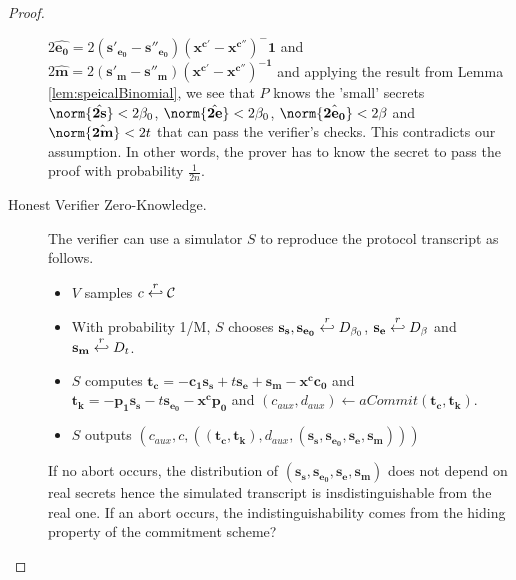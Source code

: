 \begin{proof}
\begin{description}
    $2\hat{\mathbf{e_0}} = 2\mathbf{(s'_{e_0}-s''_{e_0})(x^{c'} -
      x^{c''})^-1}$ and $2\hat{\mathbf{m}}=2\mathbf{(s'_m -
      s''_m)(x^{c'} - x^{c''})^{-1}}$ and applying the result from Lemma
    \ref{lem:speicalBinomial}, we see that $P$ knows the 'small' secrets
    $\norm{\hat{\mathbf{2s}}} < 2\beta_0$, $\norm{\hat{\mathbf{2e}}} <
    2\beta_0$, $\norm{\hat{\mathbf{2e_0}}} < 2\beta$ and
    $\norm{\hat{\mathbf{2m}}} < 2t$ that can pass the verifier's checks.
    This contradicts our assumption. In other words, the prover has to
    know the secret to pass the proof with probability
    $\frac{1}{2n}$.
  \item [Honest Verifier Zero-Knowledge.] The verifier can use a
    simulator $S$ to reproduce the
    protocol transcript as follows.
    \begin{itemize}
    \item $V$ samples $c \stackrel{r}{\hookleftarrow} \mathcal{C}$
    \item With probability 1/M, $S$ chooses $\mathbf{s_s, s_{e_0}}
      \stackrel{r}{\hookleftarrow} D_{\beta_0}$, $\mathbf{s_e} \stackrel{r}{\hookleftarrow}
      D_{\beta}$ and $\mathbf{s_m} \stackrel{r}{\hookleftarrow} D_t$.
    \item $S$
      computes $\mathbf{t_c} = \mathbf{-c_1s_s} + t\mathbf{s_e} +
      \mathbf{s_m} - \mathbf{x^cc_0}$ and $\mathbf{t_k} =
      -\mathbf{p_1s_s} -t\mathbf{s_{e_0}} - \mathbf{x^cp_0}$ and
      $(c_{aux}, d_{aux}) \leftarrow aCommit(\mathbf{t_c,t_k})$.
    \item $S$ outputs $(c_{aux}, c, (\mathbf{(t_c,t_k)},
      d_{aux},(\mathbf{s_s,s_{e_0},s_e,s_m})))$
    \end{itemize}
    If no abort occurs, the distribution of $\mathbf{(s_s, s_{e_0}, s_e,
      s_m)}$ does not depend on real secrets hence the simulated
    transcript is insdistinguishable from the real one. If an abort
    occurs, the indistinguishability comes from the hiding property of
    the commitment scheme?

  \end{description}
\end{proof}

